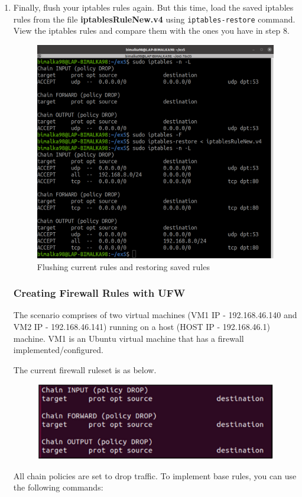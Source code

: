 \documentclass[11pt,letterpaper]{article}
\newenvironment{answer}{\em \color{blue} \begin{adjustwidth}{1cm}{1cm}}{\end{adjustwidth}}
\begin{document}
\begin{enumerate}
		\item Finally, flush your iptables rules again. But this time, load the saved iptables rules from the file \textbf{iptablesRuleNew.v4} using \texttt{iptables-restore} command. View the iptables rules and compare them with the ones you have in step 8.
		\begin{answer}
			\begin{figure}[H]
				\centering
				\includegraphics[width=0.65\columnwidth]{images/part1/11.png}
				\caption{Flushing current rules and restoring saved rules}
			\end{figure}
		\end{answer}
		
		\subsubsection*{Creating Firewall Rules with UFW}
		
		The scenario comprises of two virtual machines (VM1 IP - 192.168.46.140 and VM2 IP - 192.168.46.141) running on a host (HOST IP - 192.168.46.1) machine. VM1 is an Ubuntu virtual machine that has a firewall implemented/configured. 
		
		The current firewall ruleset is as below.
		\begin{figure}[H]
			\centering
			\includegraphics[width=0.5\columnwidth]{images/ex5-firewall-rules.png}
		\end{figure}
		
		All chain policies are set to drop traffic. To implement base rules, you can use the following commands:
		

\end{enumerate}
\end{document}
